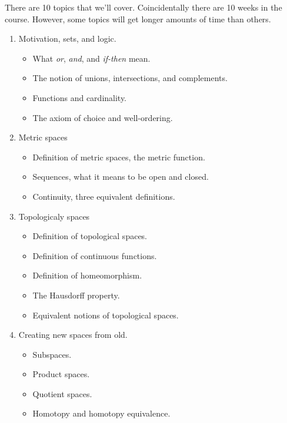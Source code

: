 \documentclass{article}
\begin{document}
    \par\hfill\par
    There are 10 topics that we'll cover. Coincidentally there are 10 weeks in
    the course. However, some topics will get longer amounts of time than
    others.
    \begin{enumerate}
        \item Motivation, sets, and logic.
            \begin{itemize}
                \item What \textit{or}, \textit{and}, and \textit{if-then} mean.
                \item The notion of unions, intersections, and complements.
                \item Functions and cardinality.
                \item The axiom of choice and well-ordering.
            \end{itemize}
        \item Metric spaces
            \begin{itemize}
                \item Definition of metric spaces, the metric function.
                \item Sequences, what it means to be open and closed.
                \item Continuity, three equivalent definitions.
            \end{itemize}
        \item Topologicaly spaces
            \begin{itemize}
                \item Definition of topological spaces.
                \item Definition of continuous functions.
                \item Definition of homeomorphism.
                \item The Hausdorff property.
                \item Equivalent notions of topological spaces.
            \end{itemize}
        \item Creating new spaces from old.
            \begin{itemize}
                \item Subspaces.
                \item Product spaces.
                \item Quotient spaces.
                \item Homotopy and homotopy equivalence.

\end{itemize}
\end{enumerate}
\end{document}
